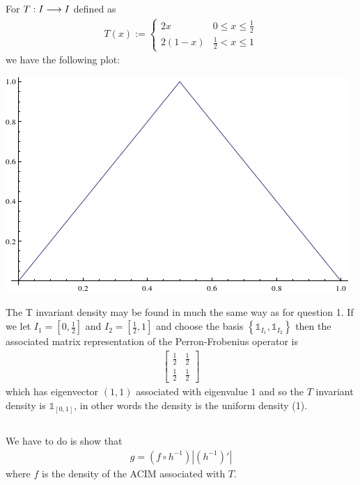 \documentclass{unswmaths}
\begin{document}
\subsection{}
For $ T : I \longrightarrow I $ defined as
\begin{align}
  T(x) := 
  \begin{cases}
    2x  & 0 \leq x \leq \frac{1}{2} \\
    2(1-x) & \frac{1}{2} < x \leq 1
  \end{cases}
\end{align}
we have the following plot:


\includegraphics[scale=0.5]{qn_4_plot}

The T invariant density may be found in much the same way as for question 1.
If we let $ I_1 = \left[0,\frac{1}{2}\right] $ and $ I_2 = \left[ \frac{1}{2}, 1 \right] $ and choose the basis
  $\left\{ \mathds{1}_{I_1}, \mathds{1}_{I_2} \right\} $ then the associated matrix representation of the Perron-Frobenius operator is 
\begin{align}
  \left[ \begin{array}{cc} \frac{1}{2} & \frac{1}{2} \\ \frac{1}{2} & \frac{1}{2} \end{array} \right]
\end{align}
which has eigenvector $ (1,1) $ associated with eigenvalue $ 1 $ and so the $ T $ invariant density is $ \mathds{1}_{[0,1]} $, in other words the density is the uniform density (1).

\subsection{}
We have to do is show that 
\begin{align}
  g = (f \circ h^{-1})|\left( h^{-1} \right)'|
\end{align}
where $ f $ is the density of the ACIM associated with $ T $.
\end{document}
